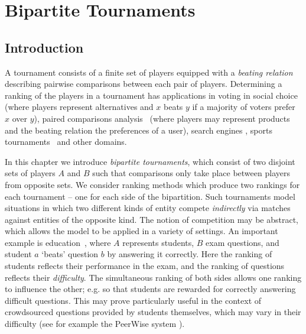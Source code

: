 \chapter{Bipartite Tournaments}
\label{chapter_bipartite_tournaments}

\section{Introduction}
\label{tourn_sec_introduction}

A tournament consists of a finite set of players equipped with a \emph{beating
relation} describing pairwise comparisons between each pair of players.
Determining a ranking of the players in a tournament has applications in voting
in social choice~\cite{brandt2016a} (where players represent alternatives and
$x$ beats $y$ if a majority of voters prefer $x$ over $y$), paired comparisons
analysis~\cite{gonzalez2014paired} (where players may represent products and
the beating relation the preferences of a user), search engines
\cite{slutzki2006scoring}, sports tournaments~\cite{bozoki2016application} and
other domains.

In this chapter we introduce \emph{bipartite tournaments}, which consist of two
disjoint sets of players $A$ and $B$ such that comparisons only take place
between players from opposite sets. We consider ranking methods which produce
two rankings for each tournament -- one for each side of the bipartition. Such
tournaments model situations in which two different kinds of entity compete
\emph{indirectly} via matches against entities of the opposite kind.
%
The notion of competition may be abstract, which allows the model to be applied
in a variety of settings. An important example is
education~\cite{jiao2017algorithms}, where $A$ represents students, $B$ exam
questions, and student $a$ `beats' question $b$ by answering it correctly. Here
the ranking of students reflects their performance in the exam, and the ranking
of questions reflects their \emph{difficulty}. The simultaneous ranking of both
sides allows one ranking to influence the other; e.g. so that students are
rewarded for correctly answering difficult questions. This may prove
particularly useful in the context of crowdsourced questions provided by
students themselves, which may vary in their difficulty (see for example the
PeerWise system \cite{denny_peerwise_2008}).

